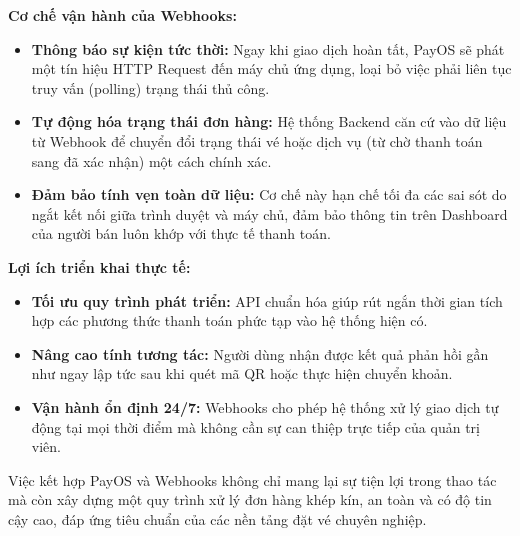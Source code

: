 \indent \textbf{Cơ chế vận hành của Webhooks:}
\begin{itemize}
    \item[-] \textbf{Thông báo sự kiện tức thời:} Ngay khi giao dịch hoàn tất, PayOS sẽ phát một tín hiệu HTTP Request đến máy chủ ứng dụng, loại bỏ việc phải liên tục truy vấn (polling) trạng thái thủ công.
    \item[-] \textbf{Tự động hóa trạng thái đơn hàng:} Hệ thống Backend căn cứ vào dữ liệu từ Webhook để chuyển đổi trạng thái vé hoặc dịch vụ (từ chờ thanh toán sang đã xác nhận) một cách chính xác.
    \item[-] \textbf{Đảm bảo tính vẹn toàn dữ liệu:} Cơ chế này hạn chế tối đa các sai sót do ngắt kết nối giữa trình duyệt và máy chủ, đảm bảo thông tin trên Dashboard của người bán luôn khớp với thực tế thanh toán.
\end{itemize}

\indent \textbf{Lợi ích triển khai thực tế:}
\begin{itemize}
    \item[-] \textbf{Tối ưu quy trình phát triển:} API chuẩn hóa giúp rút ngắn thời gian tích hợp các phương thức thanh toán phức tạp vào hệ thống hiện có.
    \item[-] \textbf{Nâng cao tính tương tác:} Người dùng nhận được kết quả phản hồi gần như ngay lập tức sau khi quét mã QR hoặc thực hiện chuyển khoản.
    \item[-] \textbf{Vận hành ổn định 24/7:} Webhooks cho phép hệ thống xử lý giao dịch tự động tại mọi thời điểm mà không cần sự can thiệp trực tiếp của quản trị viên.
\end{itemize}

\indent \indent Việc kết hợp PayOS và Webhooks không chỉ mang lại sự tiện lợi trong thao tác mà còn xây dựng một quy trình xử lý đơn hàng khép kín, an toàn và có độ tin cậy cao, đáp ứng tiêu chuẩn của các nền tảng đặt vé chuyên nghiệp.


